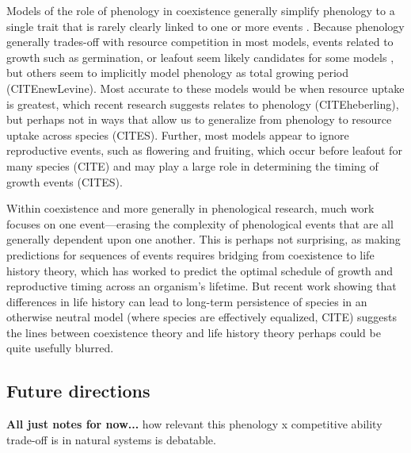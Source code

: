 \documentclass[11pt]{article}
\begin{document}
Models of the role of phenology in coexistence generally simplify phenology to a single trait that is rarely clearly linked to one or more events \citep[even when studied with empirical data][]{godoy2014} . Because phenology generally trades-off with resource competition in most models, events related to growth such as germination, or leafout seem likely candidates for some models \citep[e.g.,][]{godoy2014,memegan2021}, but others seem to implicitly model phenology as total growing period (CITEnewLevine). Most accurate to these models would be when resource uptake is greatest, which recent research suggests relates to phenology (CITEheberling), but perhaps not in ways that allow us to generalize from phenology to resource uptake across species (CITES). Further, most models appear to ignore reproductive events, such as flowering and fruiting, which occur before leafout for many species (CITE) and may play a large role in determining the timing of growth events (CITES). 

Within coexistence and more generally in phenological research, much work focuses on one event---erasing the complexity of phenological events that are all generally dependent upon one another. This is perhaps not surprising, as making predictions for sequences of events requires bridging from coexistence to life history theory, which has worked to predict the optimal schedule of growth and reproductive timing across an organism's lifetime. But recent work showing that differences in life history can lead to long-term persistence of species in an otherwise neutral model (where species are effectively equalized, CITE) suggests the lines between coexistence theory and life history theory perhaps could be quite usefully blurred. 


\subsection*{Future directions}


{\bf All just notes for now...}
 how relevant this phenology x competitive ability  trade-off is in natural systems is debatable. 
 
\end{document}
